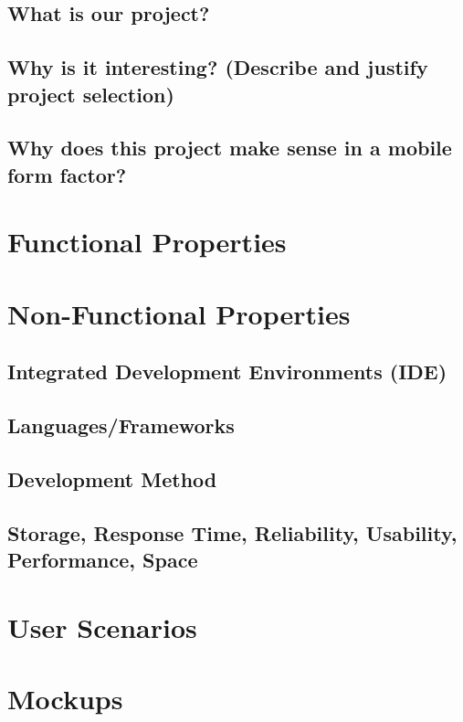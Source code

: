 \documentclass{article}
\begin{document}
\subsection*{What is our project? }
\subsection*{Why is it interesting? (Describe and justify project selection)}
\subsection*{Why does this project make sense in a mobile form factor?}

\section*{Functional Properties}
\section*{Non-Functional Properties}

\subsection*{Integrated Development Environments (IDE)}
\subsection*{Languages/Frameworks}
\subsection*{Development Method}
\subsection*{Storage, Response Time, Reliability, Usability, Performance, Space}
\section*{User Scenarios}
\clearpage
\section*{Mockups}
\end{document}
